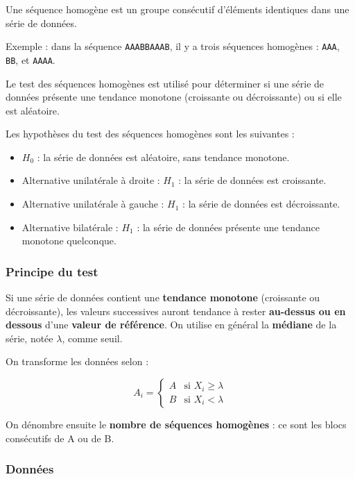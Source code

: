 \documentclass[
  12pt,
]{article}
\providecommand{\tightlist}{%
  \setlength{\itemsep}{0pt}\setlength{\parskip}{0pt}}
\begin{document}
Une séquence homogène est un groupe consécutif d'éléments identiques
dans une série de données.

Exemple : dans la séquence \texttt{AAABBAAAB}, il y a trois séquences
homogènes : \texttt{AAA}, \texttt{BB}, et \texttt{AAAA}.

Le test des séquences homogènes est utilisé pour déterminer si une série
de données présente une tendance monotone (croissante ou décroissante)
ou si elle est aléatoire.

Les hypothèses du test des séquences homogènes sont les suivantes :

\begin{itemize}
\tightlist
\item
  \(H_0\) : la série de données est aléatoire, sans tendance monotone.
\item
  Alternative unilatérale à droite : \(H_1\) : la série de données est
  croissante.
\item
  Alternative unilatérale à gauche : \(H_1\) : la série de données est
  décroissante.
\item
  Alternative bilatérale : \(H_1\) : la série de données présente une
  tendance monotone quelconque.
\end{itemize}

\subsubsection{Principe du test}\label{principe-du-test}

Si une série de données contient une \textbf{tendance monotone}
(croissante ou décroissante), les valeurs successives auront tendance à
rester \textbf{au-dessus ou en dessous} d'une \textbf{valeur de
référence}. On utilise en général la \textbf{médiane} de la série, notée
\(\lambda\), comme seuil.

On transforme les données selon :

\[
A_i = \begin{cases}
A & \text{si } X_i \geq \lambda \\
B & \text{si } X_i < \lambda
\end{cases}
\]

On dénombre ensuite le \textbf{nombre de séquences homogènes} : ce sont
les blocs consécutifs de A ou de B.

\subsubsection{Données}\label{donnuxe9es-1}
\end{document}
